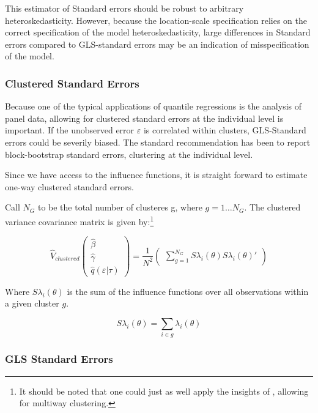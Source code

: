 \documentclass[
  authoryear,
  review,
  1p]{elsarticle}
\begin{document}
This estimator of Standard errors should be robust to arbitrary
heteroskedasticity. However, because the location-scale specification
relies on the correct specification of the model heteroskedasticity,
large differences in Standard errors compared to GLS-standard errors may
be an indication of misspecification of the model.

\hypertarget{clustered-standard-errors}{%
\subsubsection{Clustered Standard
Errors}\label{clustered-standard-errors}}

Because one of the typical applications of quantile regressions is the
analysis of panel data, allowing for clustered standard errors at the
individual level is important. If the unobserved error \(\varepsilon\)
is correlated within clusters, GLS-Standard errors could be severily
biased. The standard recommendation has been to report block-bootstrap
standard errors, clustering at the individual level.

Since we have access to the influence functions, it is straight forward
to estimate one-way clustered standard errors.

Call \(N_G\) to be the total number of clusteres g, where
\(g=1\dots N_G\). The clustered variance covariance matrix is given
by:\footnote{It should be noted that one could just as well apply the
  insights of \citet{cameron_robust_2011}, allowing for multiway
  clustering.}

\[\hat{V}_{clustered}
  \begin{pmatrix}
  \hat\beta \\
  \hat\gamma \\
  \hat q(\varepsilon|\tau)
  \end{pmatrix}
 = \frac{1}{N^2} 
 \begin{pmatrix}
 \sum_{g=1}^{N_G} S\lambda_i(\theta) S\lambda_i(\theta)'
  \end{pmatrix}
\]

Where \(S\lambda_i(\theta)\) is the sum of the influence functions over
all observations within a given cluster \(g\).

\[S\lambda_i(\theta) = \sum_{i\in g} \lambda_i(\theta)
\]

\hypertarget{gls-standard-errors}{%
\subsubsection{GLS Standard Errors}\label{gls-standard-errors}}
\end{document}
